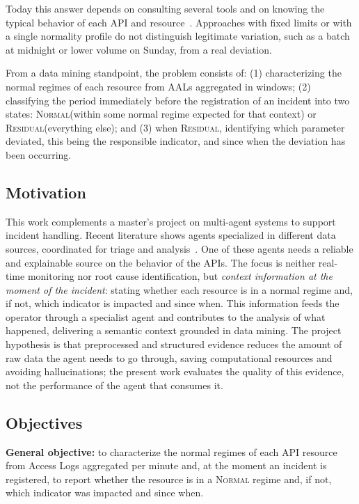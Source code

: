 \documentclass[sigconf,nonacm]{acmart}
\newcommand{\Normal}{\textsc{Normal}\xspace}
\newcommand{\Residual}{\textsc{Residual}\xspace}
\begin{document}
Today this answer depends on consulting several tools and on knowing the typical behavior of each API and resource~\citep{kataria2025isre}. Approaches with fixed limits or with a single normality profile do not distinguish legitimate variation, such as a batch at midnight or lower volume on Sunday, from a real deviation.

From a data mining standpoint, the problem consists of: (1) characterizing the normal regimes of each resource from AALs aggregated in windows; (2) classifying the period immediately before the registration of an incident into two states: \Normal (within some normal regime expected for that context) or \Residual (everything else); and (3) when \Residual, identifying which parameter deviated, this being the responsible indicator, and since when the deviation has been occurring.


\subsection{Motivation}
This work complements a master's project on multi-agent systems to support incident handling. Recent literature shows agents specialized in different data sources, coordinated for triage and analysis~\citep{yu2025triangle,luo2025opsagent,kataria2025isre}. One of these agents needs a reliable and explainable source on the behavior of the APIs. The focus is neither real-time monitoring nor root cause identification, but \emph{context information at the moment of the incident}: stating whether each resource is in a normal regime and, if not, which indicator is impacted and since when. This information feeds the operator through a specialist agent and contributes to the analysis of what happened, delivering a semantic context grounded in data mining. The project hypothesis is that preprocessed and structured evidence reduces the amount of raw data the agent needs to go through, saving computational resources and avoiding hallucinations; the present work evaluates the quality of this evidence, not the performance of the agent that consumes it.

\subsection{Objectives}
\textbf{General objective:} to characterize the normal regimes of each API resource from Access Logs aggregated per minute and, at the moment an incident is registered, to report whether the resource is in a \Normal regime and, if not, which indicator was impacted and since when.
\end{document}
